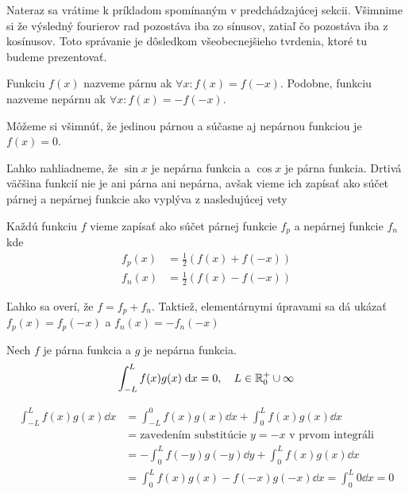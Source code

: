Nateraz sa vrátime k príkladom spomínaným v predchádzajúcej sekcii.
Všimnime si že  výsledný fourierov rad pozostáva iba zo
sínusov, zatiaľ čo  pozostáva iba z kosínusov. Toto
správanie je dôsledkom všeobecnejšieho tvrdenia, ktoré tu budeme
prezentovať.
\begin{definicia}
    Funkciu $f(x)$ nazveme párnu ak
    $\forall x: f(x) = f(-x)$. Podobne, funkciu nazveme nepárnu ak
    $\forall x: f(x) = - f(-x)$.
\end{definicia}
\begin{poznamka}
    Môžeme si všimnúť, že jedinou párnou a súčasne aj nepárnou
    funkciou je $f(x)=0$.
\end{poznamka}
Ľahko nahliadneme, že $\sin x$ je nepárna funkcia a $\cos x$ je párna
funkcia. Drtivá väčšina funkcií nie je ani párna ani nepárna, avšak
vieme ich zapísať ako súčet párnej a nepárnej funkcie ako vyplýva z
nasledujúcej vety
\begin{lema}
    Každú funkciu $f$ vieme zapísať ako súčet párnej funkcie $f_p$
    a nepárnej funkcie $f_n$ kde
    \begin{align}
        f_p(x) &= \frac{1}{2} (f(x) + f(-x)) \\
        f_n(x) &= \frac{1}{2} (f(x) - f(-x))
    \end{align}
\end{lema}
\begin{dokaz}
    Ľahko sa overí, že $f = f_p + f_n$. Taktiež, elementárnymi
    úpravami sa dá ukázať $f_p(x) = f_p(-x)$ a $f_n(x) = - f_n(-x)$
\end{dokaz}

\begin{veta}
    Nech $f$ je párna funkcia a $g$ je nepárna funkcia.
    \begin{equation}
        \int_{-L}^{L} f(x) g(x) \; \mathrm{d} x = 0, \quad L \in {\mathbb R}_0^+ \cup
        \infty
    \end{equation}
    \label{veta:int_parna_neparna}
\end{veta}
\begin{dokaz}
    \begin{equation}
    \begin{split}
      \int_{-L}^{L} f(x) g(x) \dd x &= 
                \int_{-L}^0 f(x) g(x) \dd x +
                \int_0^L f(x) g(x) \dd x \\
            &= \text{zavedením substitúcie $y=-x$ v prvom integráli}
            \\
            &= - \int_{0}^{L} f(-y) g(-y) \dd y + 
                \int_0^L f(x) g(x) \dd x \\
            &= \int_0^L f(x) g(x) - f(-x) g(-x) \dd x 
             = \int_0^L 0 \dd x= 0
    \end{split}
    \end{equation}
\end{dokaz}

